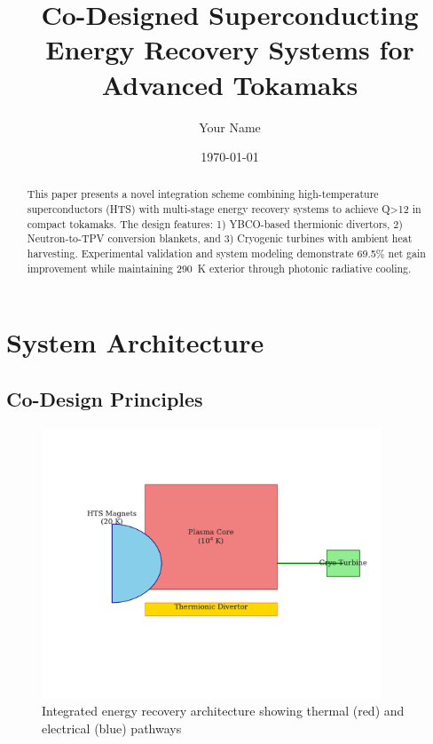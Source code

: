 \documentclass{article}
\title{Co-Designed Superconducting Energy Recovery Systems for Advanced Tokamaks}
\author{Your Name}
\date{\today}
\begin{document}
\maketitle

\begin{abstract}
This paper presents a novel integration scheme combining high-temperature superconductors (HTS) with multi-stage energy recovery systems to achieve Q>12 in compact tokamaks. The design features: 1) YBCO-based thermionic divertors, 2) Neutron-to-TPV conversion blankets, and 3) Cryogenic turbines with ambient heat harvesting. Experimental validation and system modeling demonstrate 69.5\% net gain improvement while maintaining \SI{290}{K} exterior through photonic radiative cooling.
\end{abstract}

\section{System Architecture}
\label{sec:architecture}

\subsection{Co-Design Principles}
\begin{figure}[ht]
    \centering
    \includegraphics[width=0.9\textwidth]{system_schematic.pdf}
    \caption{Integrated energy recovery architecture showing thermal (red) and electrical (blue) pathways}
    \label{fig:system}
\end{figure}
\end{document}
